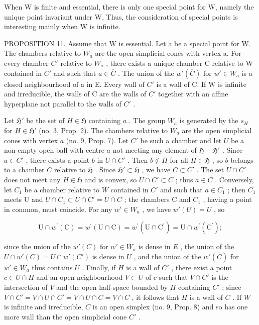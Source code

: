 When W is finite and essential, there is only one special point for W, namely the unique point invariant under W. Thus, the consideration of special points is interesting mainly when W is infinite.

PROPOSITION 11. Assume that W is essential. Let a be a special point for W. The chambers relative to \(W_{a}\) are the open simplicial cones with vertex a. For every chamber \(C'\) relative to \(W_{a}\) , there exists a unique chamber C relative to W contained in \(C'\) and such that \(a \in \overline{C}\) . The union of the \(w'(\overline{C})\) for \(w' \in W_{a}\) is a closed neighbourhood of a in E. Every wall of \(C'\) is a wall of C. If W is infinite and irreducible, the walls of C are the walls of \(C'\) together with an affine hyperplane not parallel to the walls of \(C'\) .

Let \(\mathfrak{H}'\) be the set of \(H \in \mathfrak{H}\) containing \(a\) . The group \(W_a\) is generated by the \(s_H\) for \(H \in \mathfrak{H}'\) (no. 3, Prop. 2). The chambers relative to \(W_a\) are the open simplicial cones with vertex \(a\) (no. 9, Prop. 7). Let \(C'\) be such a chamber and let \(U\) be a non-empty open ball with centre \(a\) not meeting any element of \(\mathfrak{H} - \mathfrak{H}'\) . Since \(a \in \overline{C'}\) , there exists a point \(b\) in \(U \cap C'\) . Then \(b \notin H\) for all \(H \in \mathfrak{H}\) , so \(b\) belongs to a chamber \(C\) relative to \(\mathfrak{H}\) . Since \(\mathfrak{H}' \subset \mathfrak{H}\) , we have \(C \subset C'\) . The set \(U \cap C'\) does not meet any \(H \in \mathfrak{H}\) and is convex, so \(U \cap C' \subset C\) ; thus \(a \in \overline{C}\) . Conversely, let \(C_1\) be a chamber relative to \(W\) contained in \(C'\) and such that \(a \in \overline{C}_{1}\) ; then \(C_{1}\) meets U and \(U \cap C_{1} \subset U \cap C' = U \cap C\) ; the chambers C and \(C_{1}\) , having a point in common, must coincide. For any \(w' \in W_{a}\) , we have \(w'(U) = U\) , so

\[
\mathrm{U} \cap w ^ {\prime} (\mathrm{C}) = w ^ {\prime} (\mathrm{U} \cap \mathrm{C}) = w ^ {\prime} (\mathrm{U} \cap \mathrm{C} ^ {\prime}) = \mathrm{U} \cap w ^ {\prime} (\mathrm{C} ^ {\prime});
\]

since the union of the \(w'(C)\) for \(w' \in W_a\) is dense in \(E\) , the union of the \(U \cap w'(C) = U \cap w'(C')\) is dense in \(U\) , and the union of the \(w'(\overline{C})\) for \(w' \in W_a\) thus contains \(U\) . Finally, if \(H\) is a wall of \(C'\) , there exist a point \(c \in U \cap H\) and an open neighbourhood \(V \subset U\) of \(c\) such that \(V \cap C'\) is the intersection of \(V\) and the open half-space bounded by \(H\) containing \(C'\) ; since \(V \cap C' = V \cap U \cap C' = V \cap U \cap C = V \cap C\) , it follows that \(H\) is a wall of \(C\) . If \(W\) is infinite and irreducible, \(C\) is an open simplex (no. 9, Prop. 8) and so has one more wall than the open simplicial cone \(C'\) .


